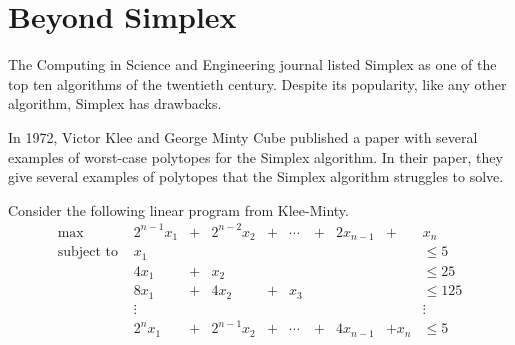 %

\section*{Beyond Simplex}
The Computing in Science and Engineering journal listed Simplex as one of the top ten algorithms of the twentieth century.\cite{Nash2000}
Despite its popularity, like any other algorithm, Simplex has drawbacks.

In 1972, Victor Klee and George Minty Cube published a paper with several examples of worst-case polytopes for the Simplex algorithm.\cite{Klee1972}
In their paper, they give several examples of polytopes that the Simplex algorithm struggles to solve.

Consider the following linear program from Klee-Minty.
\begin{align*}
\text{max } & 2^{n-1}x_1 & + & 2^{n-2}x_2  & + & \cdots & + & 2x_{n-1} & + & x_n\\
\text{subject to } & x_1 &  &  &  &  &  &  &  &\leq 5\\
& 4x_1 & + & x_2 &  &  &  &  &  &\leq 25\\
& 8x_1 & + & 4x_2 & + & x_3 &  &  &  &\leq 125\\
& \vdots & &      &   &     &  &  &  &\vdots\\
& 2^n x_1 & + & 2^{n-1} x_2 & + & \cdots & + & 4x_{n-1} & + x_n &\leq 5\\
\end{align*}

